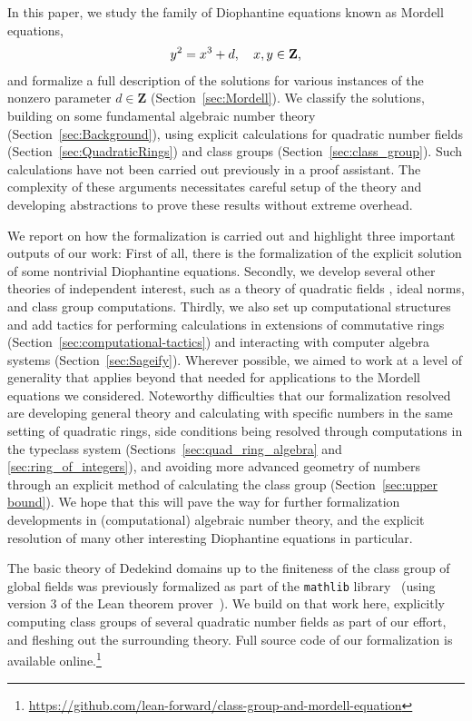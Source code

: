 \documentclass[sigplan,10pt,nonacm,
screen]{acmart} \settopmatter{printfolios=true,printccs=false,printacmref=false}
\newcommand{\mathlib}{\lstinline{mathlib}\xspace}
\newcommand{\ZZ}{\mathbf{Z}}
\begin{document}
In this paper, we study the family of Diophantine equations known as Mordell equations,
\begin{equation}\label{eqn:Mordell}
 y^2=x^3+d, \quad x,y \in \ZZ\text,
\end{equation}
and formalize a full description of the solutions for various instances of the nonzero parameter $d \in \ZZ$ (Section~\ref{sec:Mordell}).
We classify the solutions, building on some fundamental algebraic number theory (Section~\ref{sec:Background}), using explicit calculations for quadratic number fields (Section~\ref{sec:QuadraticRings}) and class groups (Section~\ref{sec:class_group}).
Such calculations have not been carried out previously in a proof assistant.
The complexity of these arguments necessitates careful setup of the theory and developing abstractions to prove these results without extreme overhead.

We report on how the formalization is carried out and highlight three important outputs of our work:
First of all, there is the formalization of the explicit solution of some nontrivial Diophantine equations.
Secondly, we develop several other theories of independent interest, such as a theory of quadratic fields%
, ideal norms, and class group computations.
Thirdly, we also set up computational structures and add tactics for performing calculations in extensions of commutative rings (Section~\ref{sec:computational-tactics}) and interacting with computer algebra systems (Section~\ref{sec:Sageify}).
Wherever possible, we aimed to work at a level of generality that applies beyond that needed for applications to the Mordell equations we considered.
Noteworthy difficulties that our formalization resolved are
developing general theory and calculating with specific numbers in the same setting of quadratic rings,
side conditions being resolved through computations in the typeclass system (Sections~\ref{sec:quad_ring_algebra} and \ref{sec:ring_of_integers}),
and avoiding more advanced geometry of numbers through an explicit method of calculating the class group (Section~\ref{sec:upper bound}).
We hope that this will pave the way for further formalization developments in (computational) algebraic number theory, and the explicit resolution of many other interesting Diophantine equations in particular.

The basic theory of Dedekind domains up to the finiteness of the class group of global fields was previously formalized \cite{baanen_formalization_2021} as part of the \mathlib library~\cite{mathlib} (using version 3 of the Lean theorem prover~\cite{lean-prover}).
We build on that work here, explicitly computing class groups of several quadratic number fields as part of our effort, and fleshing out the surrounding theory.
Full source code of our formalization is available online.\footnote{\url{https://github.com/lean-forward/class-group-and-mordell-equation}}
\end{document}
